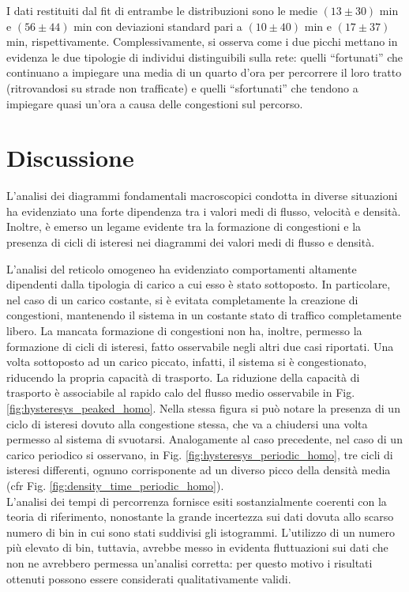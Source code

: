 \documentclass[../main.tex]{subfiles}
\begin{document}
I dati restituiti dal fit di entrambe le distribuzioni sono le medie $(13 \pm 30)$ min e $(56 \pm 44)$ min con deviazioni standard pari a $(10 \pm 40)$ min e $(17 \pm 37)$ min, rispettivamente.
Complessivamente, si osserva come i due picchi mettano in evidenza le due tipologie di individui distinguibili sulla rete: quelli ``fortunati'' che continuano a impiegare una media di un quarto d'ora per percorrere il loro tratto (ritrovandosi su strade non trafficate) e quelli ``sfortunati'' che tendono a impiegare quasi un'ora a causa delle congestioni sul percorso.

\section{Discussione}
L'analisi dei diagrammi fondamentali macroscopici condotta in diverse situazioni ha evidenziato una forte dipendenza tra i valori medi di flusso, velocit\`a e densit\`a.
Inoltre, \`e emerso un legame evidente tra la formazione di congestioni e la presenza di cicli di isteresi nei diagrammi dei valori medi di flusso e densit\`a.


L'analisi del reticolo omogeneo ha evidenziato comportamenti altamente dipendenti dalla tipologia di carico a cui esso \`e stato sottoposto.
In particolare, nel caso di un carico costante, si \`e evitata completamente la creazione di congestioni, mantenendo il sistema in un costante stato di traffico completamente libero.
La mancata formazione di congestioni non ha, inoltre, permesso la formazione di cicli di isteresi, fatto osservabile negli altri due casi riportati.
Una volta sottoposto ad un carico piccato, infatti, il sistema si \`e congestionato, riducendo la propria capacit\`a di trasporto.
La riduzione della capacit\`a di trasporto \`e associabile al rapido calo del flusso medio osservabile in Fig. \ref{fig:hysteresys_peaked_homo}.
Nella stessa figura si pu\`o notare la presenza di un ciclo di isteresi dovuto alla congestione stessa, che va a chiudersi una volta permesso al sistema di svuotarsi.
Analogamente al caso precedente, nel caso di un carico periodico si osservano, in Fig. \ref{fig:hysteresys_periodic_homo}, tre cicli di isteresi differenti, ognuno corrisponente ad un diverso picco della densit\`a media (cfr Fig. \ref{fig:density_time_periodic_homo}).\\
L'analisi dei tempi di percorrenza fornisce esiti sostanzialmente coerenti con la teoria di riferimento, nonostante la grande incertezza sui dati dovuta allo scarso numero di bin in cui sono stati suddivisi gli istogrammi.
L'utilizzo di un numero pi\`u elevato di bin, tuttavia, avrebbe messo in evidenta fluttuazioni sui dati che non ne avrebbero permessa un'analisi corretta: per questo motivo i risultati ottenuti possono essere considerati qualitativamente validi.
\end{document}

